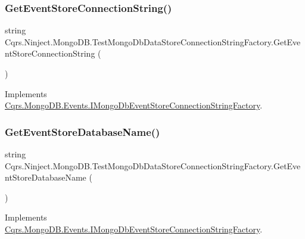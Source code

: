 \subsubsection{\texorpdfstring{Get\+Event\+Store\+Connection\+String()}{GetEventStoreConnectionString()}}
{\footnotesize\ttfamily string Cqrs.\+Ninject.\+Mongo\+D\+B.\+Test\+Mongo\+Db\+Data\+Store\+Connection\+String\+Factory.\+Get\+Event\+Store\+Connection\+String (\begin{DoxyParamCaption}{ }\end{DoxyParamCaption})}



Implements \hyperlink{interfaceCqrs_1_1MongoDB_1_1Events_1_1IMongoDbEventStoreConnectionStringFactory_a3860ea4bf6793b081f03fb7cc1dcbb27_a3860ea4bf6793b081f03fb7cc1dcbb27}{Cqrs.\+Mongo\+D\+B.\+Events.\+I\+Mongo\+Db\+Event\+Store\+Connection\+String\+Factory}.

\mbox{\label{classCqrs_1_1Ninject_1_1MongoDB_1_1TestMongoDbDataStoreConnectionStringFactory_ae34e14a01ee79e427a87b6ef2c220288_ae34e14a01ee79e427a87b6ef2c220288}} 
\subsubsection{\texorpdfstring{Get\+Event\+Store\+Database\+Name()}{GetEventStoreDatabaseName()}}
{\footnotesize\ttfamily string Cqrs.\+Ninject.\+Mongo\+D\+B.\+Test\+Mongo\+Db\+Data\+Store\+Connection\+String\+Factory.\+Get\+Event\+Store\+Database\+Name (\begin{DoxyParamCaption}{ }\end{DoxyParamCaption})}



Implements \hyperlink{interfaceCqrs_1_1MongoDB_1_1Events_1_1IMongoDbEventStoreConnectionStringFactory_a81ee28bfbb0e567b95f2b280bc6fb298_a81ee28bfbb0e567b95f2b280bc6fb298}{Cqrs.\+Mongo\+D\+B.\+Events.\+I\+Mongo\+Db\+Event\+Store\+Connection\+String\+Factory}.



